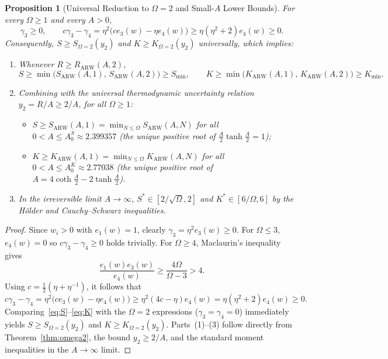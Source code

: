 \documentclass[11pt]{article}
\newtheorem{proposition}[theorem]{Proposition}
\theoremstyle{definition}
\theoremstyle{remark}
\begin{document}
\begin{proposition}[Universal Reduction to $\Omega = 2$ and Small-$A$ Lower Bounds]
For every $\Omega \ge 1$ and every $A > 0$,
\[
  \gamma_3 \ge 0,
  \qquad
  c\gamma_3 - \gamma_4 = \eta^2\bigl(c e_3(w) - \eta e_4(w)\bigr) \ge \eta(\eta^2 + 2)e_4(w) \ge 0.
\]
Consequently, $S \ge S_{\Omega=2}(y_2)$ and $K \ge K_{\Omega=2}(y_2)$ universally, which implies:
\begin{enumerate}[leftmargin=2em,itemsep=3pt]
  \item Whenever $R \ge R_{\mathrm{ARW}}(A, 2)$,
  \[
    S \ge \min\bigl(S_{\mathrm{ARW}}(A,1),\, S_{\mathrm{ARW}}(A,2)\bigr) \ge S_{\min},
    \qquad
    K \ge \min\bigl(K_{\mathrm{ARW}}(A,1),\, K_{\mathrm{ARW}}(A,2)\bigr) \ge K_{\min}.
  \]
  \item Combining with the universal thermodynamic uncertainty relation $y_2 = R/A \ge 2/A$, for all $\Omega \ge 1$:
  \begin{itemize}[leftmargin=1.5em,itemsep=2pt]
    \item $S \ge S_{\mathrm{ARW}}(A,1) = \min_{N\le\Omega} S_{\mathrm{ARW}}(A,N)$ for all $0 < A \le A_0^S \approx 2.399357$ (the unique positive root of $\frac{A}{2}\tanh\frac{A}{2} = 1$);
    \item $K \ge K_{\mathrm{ARW}}(A,1) = \min_{N\le\Omega} K_{\mathrm{ARW}}(A,N)$ for all $0 < A \le A_0^K \approx 2.77038$ (the unique positive root of $A = 4\coth\frac{A}{2} - 2\tanh\frac{A}{2}$).
  \end{itemize}
  \item In the irreversible limit $A \to \infty$, $S^* \in [2/\sqrt{\Omega}, 2]$ and $K^* \in [6/\Omega, 6]$ by the H\"older and Cauchy--Schwarz inequalities.
\end{enumerate}
\end{proposition}

\begin{proof}
Since $w_i > 0$ with $e_1(w) = 1$, clearly $\gamma_3 = \eta^2 e_3(w) \ge 0$. For $\Omega \le 3$, $e_4(w) = 0$ so $c\gamma_3 - \gamma_4 \ge 0$ holds trivially. For $\Omega \ge 4$, Maclaurin's inequality gives
\[
  \frac{e_1(w)e_3(w)}{e_4(w)} \ge \frac{4\Omega}{\Omega - 3} > 4.
\]
Using $c = \frac{1}{2}(\eta + \eta^{-1})$, it follows that
\[
  c\gamma_3 - \gamma_4 = \eta^2\bigl(c e_3(w) - \eta e_4(w)\bigr) \ge \eta^2(4c - \eta)e_4(w) = \eta(\eta^2 + 2)e_4(w) \ge 0.
\]
Comparing~\eqref{eq:S}--\eqref{eq:K} with the $\Omega = 2$ expressions ($\gamma_3 = \gamma_4 = 0$) immediately yields $S \ge S_{\Omega=2}(y_2)$ and $K \ge K_{\Omega=2}(y_2)$. Parts~(1)--(3) follow directly from Theorem~\ref{thm:omega2}, the bound $y_2 \ge 2/A$, and the standard moment inequalities in the $A \to \infty$ limit.
\end{proof}
\end{document}
